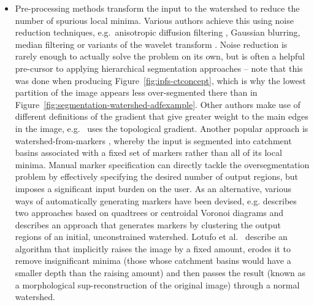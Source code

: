 \documentclass[preprint,a4paper]{elsarticle}
\begin{document}
\begin{itemize}

\item Pre-processing methods \cite{prochazka10,belaid09,meyer90,consularo07,gonzalez09,lotufo02b} transform the input to the watershed to reduce the number of spurious local minima. Various authors achieve this using noise reduction techniques, e.g.~anisotropic diffusion filtering \cite{perona90}, Gaussian blurring, median filtering or variants of the wavelet transform \cite{prochazka10}. Noise reduction is rarely enough to actually solve the problem on its own, but is often a helpful pre-cursor to applying hierarchical segmentation approaches -- note that this was done when producing Figure~\ref{fig:ipfs-ctconcept}, which is why the lowest partition of the image appears less over-segmented there than in Figure~\ref{fig:segmentation-watershed-adfexample}. Other authors make use of different definitions of the gradient that give greater weight to the main edges in the image, e.g.~\cite{belaid09} uses the topological gradient. Another popular approach is watershed-from-markers \cite{meyer90}, whereby the input is segmented into catchment basins associated with a fixed set of markers rather than all of its local minima. Manual marker specification can directly tackle the oversegmentation problem by effectively specifying the desired number of output regions, but imposes a significant input burden on the user. As an alternative, various ways of automatically generating markers have been devised, e.g. \cite{consularo07} describes two approaches based on quadtrees or centroidal Voronoi diagrams and \cite{gonzalez09} describes an approach that generates markers by clustering the output regions of an initial, unconstrained watershed. Lotufo et al.\ \cite{lotufo02b} describe an algorithm that implicitly raises the image by a fixed amount, erodes it to remove insignificant minima (those whose catchment basins would have a smaller depth than the raising amount) and then passes the result (known as a morphological sup-reconstruction of the original image) through a normal watershed.


\end{itemize}
\end{document}
